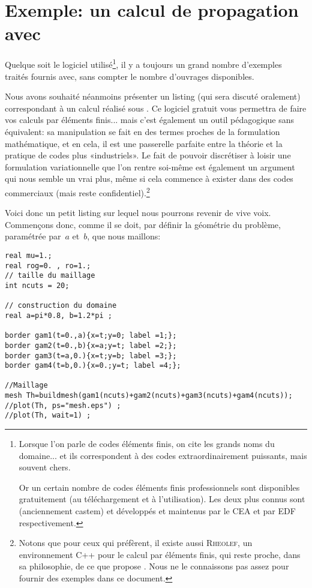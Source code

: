 \section{Exemple: un calcul de propagation avec \freefem}

\medskip
Quelque soit le logiciel utilisé\footnote{Lorsque l'on parle de codes éléments finis, on cite les grands noms du domaine... et ils correspondent à des codes extraordinairement puissants, mais souvent chers.

Or un certain nombre de codes éléments finis professionnels sont disponibles gratuitement (au téléchargement et à l'utilisation). Les deux plus connus sont \castem (anciennement castem) et \aster développés et maintenus par le CEA et par EDF respectivement.}, il y a toujours un grand nombre d'exemples traités fournis avec, sans compter le nombre d'ouvrages disponibles.

\medskip
Nous avons souhaité néanmoins présenter un listing (qui sera discuté oralement) correspondant à un calcul réalisé sous \freefem.
Ce logiciel gratuit vous permettra de faire vos calculs par éléments finis... mais c'est également un outil pédagogique sans équivalent: sa manipulation se fait en des termes proches de la formulation mathématique, et en cela, il est une passerelle parfaite entre la théorie et la pratique de codes plus «industriels».
Le fait de pouvoir discrétiser à loisir une formulation variationnelle que l'on rentre soi-même est également un argument qui nous semble un vrai plus, même si cela commence à exister dans des codes commerciaux (mais reste confidentiel).\footnote{Notons que pour ceux qui préfèrent, il existe aussi \textsc{Rheolef}, un environnement C++ pour le calcul par éléments finis, qui reste proche, dans sa philosophie, de ce que propose \freefem. Nous ne le connaissons pas assez pour fournir des exemples dans ce document.}

\medskip
Voici donc un petit listing sur lequel nous pourrons revenir de vive voix.
Commençons donc, comme il se doit, par définir la géométrie du problème, paramétrée par~$a$ et~$b$, que nous maillons:
\lstset{language=freefem++}
\begin{lstlisting}[firstnumber=1]
real mu=1.; 
real rog=0. , ro=1.;
// taille du maillage
int ncuts = 20;

// construction du domaine
real a=pi*0.8, b=1.2*pi ; 

border gam1(t=0.,a){x=t;y=0; label =1;};
border gam2(t=0.,b){x=a;y=t; label =2;};
border gam3(t=a,0.){x=t;y=b; label =3;};
border gam4(t=b,0.){x=0.;y=t; label =4;};

//Maillage
mesh Th=buildmesh(gam1(ncuts)+gam2(ncuts)+gam3(ncuts)+gam4(ncuts)); 
//plot(Th, ps="mesh.eps") ;
//plot(Th, wait=1) ;
\end{lstlisting}

